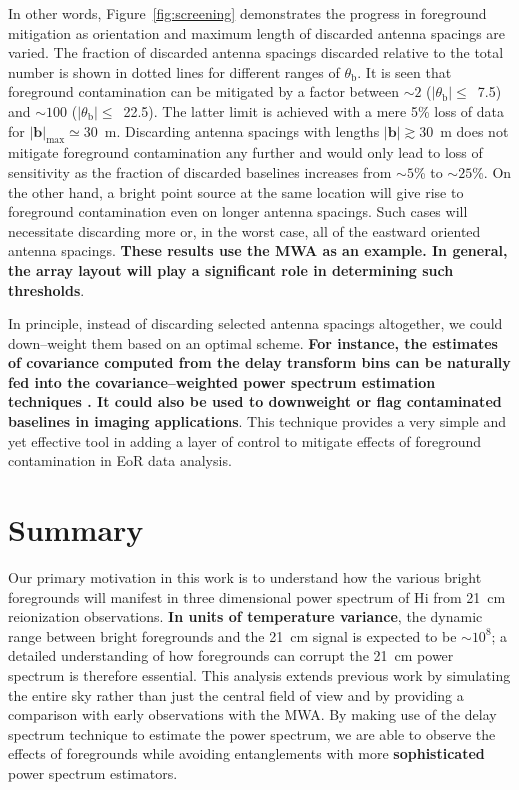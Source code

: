 \documentclass[preprint2,iop,numberedappendix,twocolappendix,appendixfloats]{emulateapj}
\begin{document}
In other words, Figure~\ref{fig:screening} demonstrates the progress in foreground mitigation as orientation and maximum length of discarded antenna spacings are varied. The fraction of discarded antenna spacings discarded relative to the total number is shown in dotted lines for different ranges of $\theta_\textrm{b}$. It is seen that foreground contamination can be mitigated by a factor between $\sim 2$ ($|\theta_\textrm{b}|\le$~7.5\arcdeg) and $\sim 100$ ($|\theta_\textrm{b}|\le$~22.5\arcdeg). The latter limit is achieved with a mere 5\% loss of data for $|\boldsymbol{b}|_\textrm{max}\simeq30$~m. Discarding antenna spacings with lengths $|\boldsymbol{b}|\gtrsim 30$~m does not mitigate foreground contamination any further and would only lead to loss of sensitivity as the fraction of discarded baselines increases from $\sim 5$\% to $\sim 25$\%. On the other hand, a bright point source at the same location will give rise to foreground contamination even on longer antenna spacings. Such cases will necessitate discarding more or, in the worst case, all of the eastward oriented antenna spacings. {\bf These results use the MWA as an example. In general, the array layout will play a significant role in determining such thresholds}.

In principle, instead of discarding selected antenna spacings altogether, we could down--weight them based on an optimal scheme. {\bf For instance, the estimates of covariance computed from the delay transform bins can be naturally fed into the covariance--weighted power spectrum estimation techniques \citep{liu14a,liu14b}. It could also be used to downweight or flag contaminated baselines in imaging applications}. This technique provides a very simple and yet effective tool in adding a layer of control to mitigate effects of foreground contamination in EoR data analysis. 

\section{Summary}\label{sec:summary}

Our primary motivation in this work is to understand how the various bright foregrounds will manifest in three dimensional power spectrum of H{\sc i} from 21~cm reionization observations. {\bf In units of temperature variance}, the dynamic range between bright foregrounds and the 21~cm signal is expected to be $\sim 10^8$; a detailed understanding of how foregrounds can corrupt the 21~cm power spectrum is therefore essential. This analysis extends previous work by simulating the entire sky rather than just the central field of view and by providing a comparison with early observations with the MWA. By making use of the delay spectrum technique to estimate the power spectrum, we are able to observe the effects of foregrounds while avoiding entanglements with more {\bf sophisticated} power spectrum estimators.  
\end{document}
